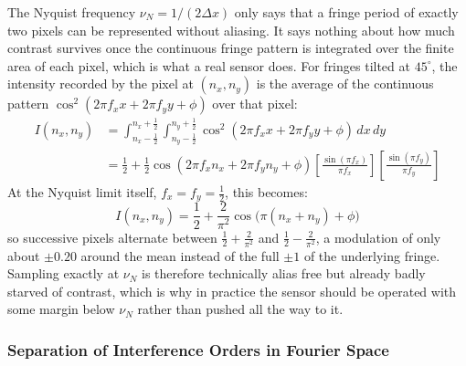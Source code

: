 The Nyquist frequency $\nu_N=1/(2\Delta x)$ only says that a fringe period of exactly two pixels can be represented without aliasing. It says nothing about how much contrast survives once the continuous fringe pattern is integrated over the finite area of each pixel, which is what a real sensor does. For fringes tilted at $45^{\circ}$, the intensity recorded by the pixel at $(n_x,n_y)$ is the average of the continuous pattern $\cos^2(2\pi f_xx+2\pi f_yy+\phi)$ over that pixel:
\begin{align}
I(n_x,n_y) &= \int_{n_x-\frac12}^{n_x+\frac12}\int_{n_y-\frac12}^{n_y+\frac12} \cos^2(2\pi f_x x+2\pi f_y y+\phi)\,dx\,dy \nonumber\\[4pt]
&= \frac12+\frac12\cos(2\pi f_xn_x+2\pi f_yn_y+\phi)\left[\frac{\sin(\pi f_x)}{\pi f_x}\right]\left[\frac{\sin(\pi f_y)}{\pi f_y}\right]
\end{align}
At the Nyquist limit itself, $f_x=f_y=\tfrac12$, this becomes:
\begin{equation}
I(n_x,n_y) = \frac12+\frac{2}{\pi^2}\cos\big(\pi(n_x+n_y)+\phi\big)
\end{equation}
so successive pixels alternate between $\tfrac12+\tfrac{2}{\pi^2}$ and $\tfrac12-\tfrac{2}{\pi^2}$, a modulation of only about $\pm0.20$ around the mean instead of the full $\pm1$ of the underlying fringe. Sampling exactly at $\nu_N$ is therefore technically alias free but already badly starved of contrast, which is why in practice the sensor should be operated with some margin below $\nu_N$ rather than pushed all the way to it.

\subsubsection{Separation of Interference Orders in Fourier Space}

